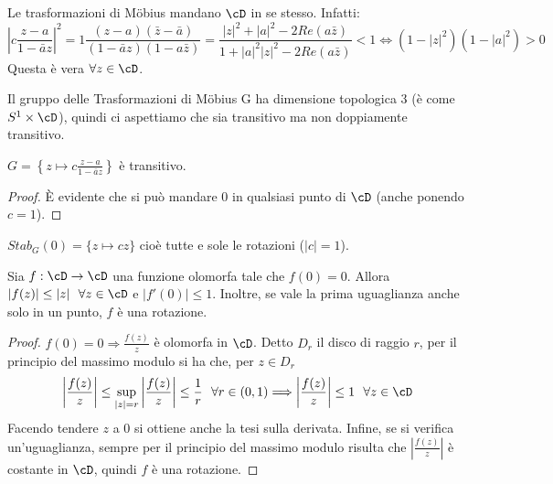 \begin{osservazione}
	Le trasformazioni di Möbius mandano $\cD$ in se stesso. Infatti:
$$\left|c \frac{z-a}{1- \bar{a}z} \right|^2 = 1 \frac{(z-a)(\bar{z}-\bar{a})}{(1- \bar{a}z)({1- a\bar{z}})}=
\frac{|z|^2 + |a|^2 - 2Re(a \bar{z})}{1+ |a|^2 |z|^2 - 2Re(a \bar{z})} <1
\Longleftrightarrow \left( 1-|z|^2 \right) \left( 1-|a|^2 \right) >0$$
	Questa è vera $\forall z \in \cD$.
\end{osservazione}

\begin{osservazione}
	Il gruppo delle Trasformazioni di Möbius G ha dimensione topologica 3 (è come $S^1 \times \cD$),
quindi ci aspettiamo che sia transitivo ma non doppiamente transitivo.
\end{osservazione}

\begin{lemma}
$G= \left \{ z \mapsto \displaystyle{c \frac{z-a}{1- \bar{a}z}} \right \}$ è transitivo.
\end{lemma}
\begin{proof}
	È evidente che si può mandare $0$ in qualsiasi punto di $\cD$ (anche ponendo $c=1$).
\end{proof}

\begin{osservazione}
$Stab_G (0) = \{z \mapsto cz \}$ cioè tutte e sole le rotazioni ($|c| = 1$).
\end{osservazione}

\begin{lemma}[di Schwarz]
	Sia $f: \cD \rightarrow \cD$ una funzione olomorfa tale che $f(0)=0$.
	Allora $|f(z)| \leq |z|\ \ \forall z \in \cD$ e $|f'(0)| \leq 1$. Inoltre, se vale la prima uguaglianza anche solo in un punto, $f$ è una rotazione.
\end{lemma}
\begin{proof}
	$f(0)=0 \Rightarrow \frac{f(z)}{z}$ è olomorfa in $\cD$. Detto $D_r$ il disco di raggio $r$,
per il principio del massimo modulo si ha che, per $z \in D_r$
$$\left| \frac{f(z)}{z} \right| \leq \sup_{|z|=r} \left| \frac{f(z)}{z} \right| \leq \frac{1}{r} \ \  \forall r \in (0,1)
	\Longrightarrow \left| \frac{f(z)}{z} \right| \leq 1 \ \ \forall z \in \cD$$
Facendo tendere $z$ a $0$ si ottiene anche la tesi sulla derivata.
Infine, se si verifica un'uguaglianza, sempre per il principio del massimo modulo risulta che
	$\left| \frac{f(z)}{z} \right|$ è costante in $\cD$, quindi $f$ è una rotazione.
\end{proof}

